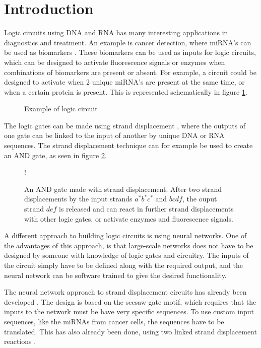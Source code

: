 \section{Introduction}
Logic circuits using DNA and RNA has many interesting applications in diagnostics and treatment. An example is cancer detection, where miRNA's can be used as biomarkers \cite{Peng2016}. These biomarkers can be used as inputs for logic circuits, which can be designed to activate fluorescence signals \cite{Seelig2006} or enzymes \cite{Engelen2016} when combinations of biomarkers are present or absent. For example, a circuit could be designed to activate when 2 unique miRNA's are present at the same time, or when a certain protein is present. This is represented schematically in figure \ref{example_circuit}.

\begin{figure}[H]
\centering

\caption{Example of logic circuit}
\label{example_circuit}
\end{figure}

The logic gates can be made using strand displacement \cite{Zhang2011}, where the outputs of one gate can be linked to the input of another by unique DNA or RNA sequences. The strand displacement technique can for example be used to create an AND gate, as seen in figure \ref{example_and}.

\begin{figure}[H]
\centering
\resizebox {\columnwidth} {!} {

}
\caption{An AND gate made with strand displacement. After two strand displacements by the input strands $a^*b^*c^*$ and $bcdf$, the ouput strand $def$ is released and can react in further strand displacements with other logic gates, or activate enzymes and fluorescence signals.}
\label{example_and}
\end{figure}

A different approach to building logic circuits is using neural networks. One of the advantages of this approach, is that large-scale networks does not have to be designed by someone with knowledge of logic gates and circuitry. The inputs of the circuit simply have to be defined along with the required output, and the neural network can be software trained to give the desired functionality.

The neural network approach to strand displacement circuits has already been developed \cite{Qian2011}. The design is based on the seesaw gate motif, which requires that the inputs to the network must be have very specific sequences. To use custom input sequences, like the miRNAs from cancer cells, the sequences have to be translated. This has also already been done, using two linked strand displacement reactions \cite{Picuri2009}.

